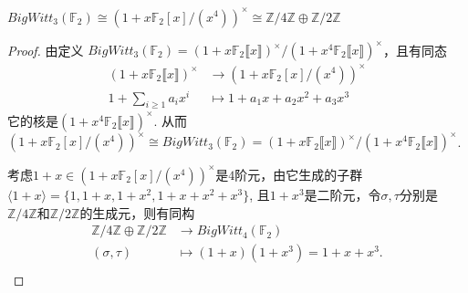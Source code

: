 \begin{example} 
\label{ex:W3(F2)}
	$BigWitt_3(\mathbb{F}_2)\cong (1+x\mathbb{F}_2[x]/(x^{4}))^{\times}\cong \mathbb{Z}/4 \mathbb{Z} \oplus\mathbb{Z}/2 \mathbb{Z}$
\end{example}
\begin{proof}
	由定义
$BigWitt_3(\mathbb{F}_2)=(1+x \mathbb{F}_2\llbracket x\rrbracket )^{\times}/(1+x^4 \mathbb{F}_2\llbracket x\rrbracket )^{\times}$，且有同态
\begin{align*}
(1+x \mathbb{F}_2\llbracket x\rrbracket )^{\times} &\longrightarrow (1+x \mathbb{F}_2[x]/(x^4))^{\times}\\
1+\sum_{i\geq 1}a_i x^i &\mapsto 1+a_1x+a_2x^2+a_3x^3
\end{align*}
它的核是$(1+x^4 \mathbb{F}_2\llbracket x\rrbracket )^{\times}$.
从而$(1+x \mathbb{F}_2[x]/(x^4))^{\times} \cong BigWitt_3(\mathbb{F}_2)=(1+x \mathbb{F}_2\llbracket x\rrbracket )^{\times}/(1+x^4 \mathbb{F}_2\llbracket x\rrbracket )^{\times}$.

考虑$1+x\in (1+x \mathbb{F}_2[x]/(x^4))^{\times}$是$4$阶元，由它生成的子群$\langle 1+x \rangle = \{1,1+x,1+x^2,1+x+x^2+x^3\}$, 且$1+x^3$是二阶元，令$\sigma,\tau$分别是$\mathbb{Z}/4 \mathbb{Z}$和$\mathbb{Z}/2 \mathbb{Z}$的生成元，则有同构
	\begin{align*}
	\mathbb{Z}/4 \mathbb{Z} \oplus \mathbb{Z}/2 \mathbb{Z} &\longrightarrow BigWitt_4(\mathbb{F}_2) \\
	(\sigma,\tau) & \mapsto (1+x)(1+x^3)=1+x+x^3. \\
	\end{align*}
\end{proof}

